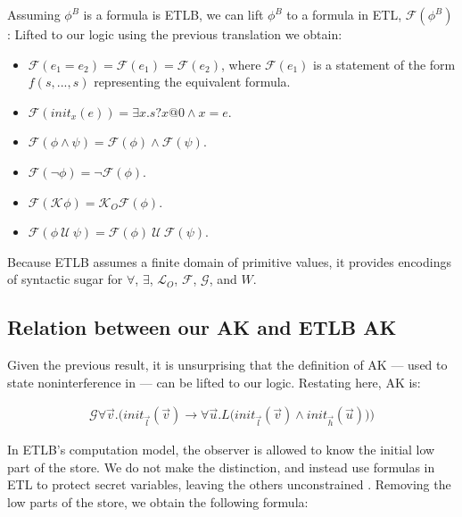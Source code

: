 \documentclass[conference]{IEEEtran}
\theoremstyle{definition}
\newcommand{\prin}{\textit{O}}
\newcommand{\etlb}{ETLB\xspace}
\newcommand{\talways}{\mathcal{G}}
\newcommand{\tfuture}{\mathcal{F}}
\newcommand{\tuntil}{~\mathcal{U}~}
\newcommand{\tknows}[1]{\mathcal{K}_{#1}}
\newcommand{\tpossible}[1]{\mathcal{L}_{#1}}
\begin{document}
\begin{Definition}[Encoding of \etlb in ETL]
  Assuming $\phi^B$ is a formula is \etlb, we can lift $\phi^B$ to a
  formula in ETL, $\mathcal{F}(\phi^B)$:
  Lifted to our logic using the previous translation we obtain:
  \begin{itemize}
  \item $\mathcal{F}(e_1 = e_2) = \mathcal{F}(e_1) =
    \mathcal{F}(e_2)$, where $\mathcal{F}(e_1)$ is a statement of the
    form $f(s, ..., s)$ representing the equivalent formula.
  \item $\mathcal{F}(init_x(e)) = \exists x . s?x@0 \land x = e$.
  \item $\mathcal{F}(\phi \land \psi) = \mathcal{F}(\phi) \land
    \mathcal{F}(\psi)$.
  \item $\mathcal{F}(\lnot \phi) = \lnot \mathcal{F}(\phi)$.
  \item $\mathcal{F}(\tknows{} \phi) = \tknows{\prin} \mathcal{F}(\phi)$.
  \item $\mathcal{F}(\phi \tuntil \psi) = \mathcal{F}(\phi) \tuntil
    \mathcal{F}(\psi)$.
  \end{itemize}
  Because \etlb assumes a finite domain of primitive values, it
  provides encodings of syntactic sugar for $\forall$, $\exists$,
  $\tpossible{\prin}$, $\tfuture$, $\talways$, and $W$.
\end{Definition}

\subsection{Relation between our AK and \etlb AK}
\label{sec:ak-translation}

Given the previous result, it is unsurprising that the definition of
AK --- used to state noninterference in \cite{Balliu:11} --- can be
lifted to our logic.  Restating here, AK is:

\begin{displaymath}
  \begin{array}{c}
    \talways \forall
    \overrightarrow{v}. \Big(init_{\overrightarrow{l}}(\overrightarrow{v})
    \rightarrow \forall \overrightarrow{u}. L
    \big(init_{\overrightarrow{l}}(\overrightarrow{v}) \land
    init_{\overrightarrow{h}}(\overrightarrow{u}) \big) \Big)
  \end{array}
\end{displaymath}

In \etlb's computation model, the observer is allowed to know the
initial low part of the store.  We do not make the distinction, and
instead use formulas in ETL to protect secret variables, leaving the
others unconstrained .  Removing the low parts of the store, we obtain
the following formula:
\end{document}
